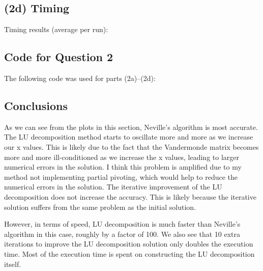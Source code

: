 \documentclass{article}
\newcommand{\CodeDir}{Code}
\begin{document}
\subsection{(2d) Timing}

Timing results (average per run):
\begin{itemize}
  
\end{itemize}

\subsection{Code for Question 2}
The following code was used for parts (2a)--(2d):


\subsection{Conclusions}
As we can see from the plots in this section, Neville's algorithm is most accurate.
The LU decomposition method starts to oscillate more and more as we increase our x values.
This is likely due to the fact that the Vandermonde matrix becomes more and more ill-conditioned as we increase the x values, leading to larger numerical errors in the solution.
I think this problem is amplified due to my method not implementing partial pivoting, which would help to reduce the numerical errors in the solution.
The iterative improvement of the LU decomposition does not increase the accuracy.
This is likely because the iterative solution suffers from the same problem as the initial solution.

However, in terms of speed, LU decomposition is much faster than Neville's algorithm in this case, roughly by a factor of 100.
We also see that 10 extra iterations to improve the LU decomposition solution only doubles the execution time.
Most of the execution time is spent on constructing the LU decomposition itself.
\end{document}
